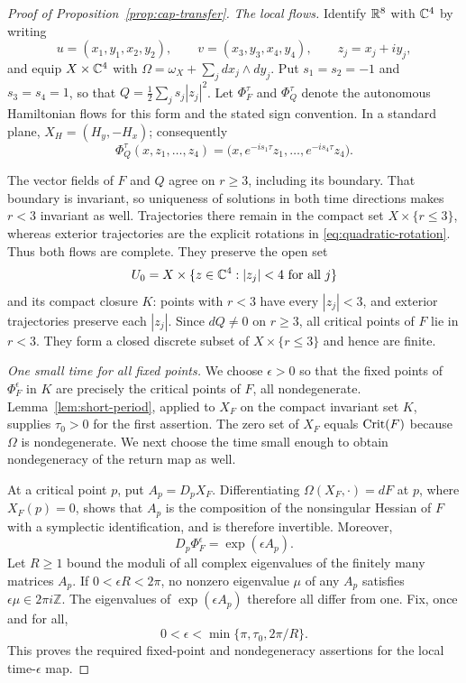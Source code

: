\begin{proof}[Proof of Proposition~\ref{prop:cap-transfer}]
\emph{The local flows.}
Identify $\mathbb R^8$ with $\mathbb C^4$ by writing
\[
 u=(x_1,y_1,x_2,y_2),\qquad
 v=(x_3,y_3,x_4,y_4),\qquad z_j=x_j+iy_j,
\]
and equip $X\times\mathbb C^4$ with
$\Omega=\omega_X+\sum_jdx_j\wedge dy_j$.
Put $s_1=s_2=-1$ and $s_3=s_4=1$, so that
$Q=\frac12\sum_js_j|z_j|^2$.
Let $\Phi_F^\tau$ and $\Phi_Q^\tau$ denote the autonomous Hamiltonian
flows for this form and the stated sign convention.  In a standard
plane, $X_H=(H_y,-H_x)$; consequently
\begin{equation}\label{eq:quadratic-rotation}
 \Phi_Q^\tau(x,z_1,\ldots,z_4)
 =\bigl(x,e^{-is_1\tau}z_1,\ldots,e^{-is_4\tau}z_4\bigr).
\end{equation}

The vector fields of $F$ and $Q$ agree on $r\ge3$, including its
boundary.  That boundary is invariant, so uniqueness of solutions in
both time directions makes $r<3$ invariant as well.  Trajectories there
remain in the compact set $X\times\{r\le3\}$, whereas exterior
trajectories are the explicit rotations in
\eqref{eq:quadratic-rotation}.  Thus both flows are complete.  They
preserve the open set
\[
 U_0=X\times\{z\in\mathbb C^4:|z_j|<4\text{ for all }j\}
\]
and its compact closure $K$: points with $r<3$ have every $|z_j|<3$,
and exterior trajectories preserve each $|z_j|$.
Since $dQ\ne0$ on $r\ge3$, all critical points of $F$ lie in $r<3$.
They form a closed discrete subset of $X\times\{r\le3\}$ and hence
are finite.

\smallskip
\noindent\emph{One small time for all fixed points.}
We choose $\epsilon>0$ so that the fixed points of
$\Phi_F^\epsilon$ in $K$ are precisely the critical points of $F$,
all nondegenerate. Lemma~\ref{lem:short-period}, applied to $X_F$ on
the compact invariant set $K$, supplies $\tau_0>0$ for the first
assertion. The zero set of $X_F$ equals $\operatorname{Crit}(F)$ because $\Omega$
is nondegenerate. We next choose the time small enough to obtain
nondegeneracy of the return map as well.

At a critical point $p$, put $A_p=D_pX_F$.  Differentiating
$\Omega(X_F,\cdot)=dF$ at $p$, where $X_F(p)=0$, shows that $A_p$
is the composition of the nonsingular Hessian of $F$ with a symplectic
identification, and is therefore invertible.  Moreover,
\[
 D_p\Phi_F^\epsilon=\exp(\epsilon A_p).
\]
Let $R\ge1$ bound the moduli of all complex eigenvalues of the finitely
many matrices $A_p$.  If $0<\epsilon R<2\pi$, no nonzero eigenvalue
$\mu$ of any $A_p$ satisfies $\epsilon\mu\in2\pi i\mathbb Z$.
The eigenvalues of $\exp(\epsilon A_p)$ therefore all differ from one.
Fix, once and for all,
\begin{equation}\label{eq:small-epsilon}
 0<\epsilon<\min\{\pi,\tau_0,2\pi/R\}.
\end{equation}
This proves the required fixed-point and nondegeneracy assertions for
the local time-$\epsilon$ map.


\end{proof}
